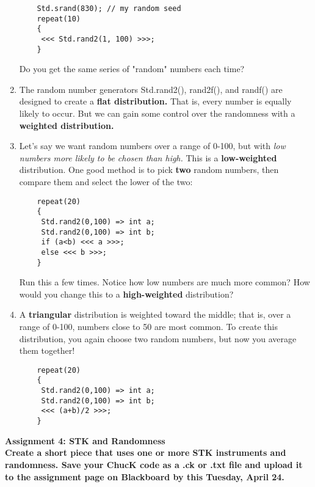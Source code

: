 \documentclass{article}
\begin{document}
\begin{enumerate}
\begin{lstlisting}
	Std.srand(830); // my random seed
	repeat(10)
	{
	 <<< Std.rand2(1, 100) >>>;
	}
\end{lstlisting}

Do you get the same series of "random" numbers each time?

\item The random number generators Std.rand2(), rand2f(), and randf() are designed to create a \textbf{flat distribution.} That is, every number is equally likely to occur. But we can gain some control over the randomness with a \textbf{weighted distribution.} 

\item Let's say we want random numbers over a range of 0-100, but with \textsl{low numbers more likely to be chosen than high.} This is a \textbf{low-weighted} distribution. One good method is to pick \textbf{two} random numbers, then compare them and select the lower of the two:

\begin{lstlisting}
	repeat(20)
	{
	 Std.rand2(0,100) => int a;
	 Std.rand2(0,100) => int b;
	 if (a<b) <<< a >>>;
	 else <<< b >>>;
	}
\end{lstlisting}

Run this a few times. Notice how low numbers are much more common? How would you change this to a \textbf{high-weighted} distribution?

\item A \textbf{triangular} distribution is weighted toward the middle; that is, over a range of 0-100, numbers close to 50 are most common. To create this distribution, you again choose two random numbers, but now you average them together!

\begin{lstlisting}
	repeat(20)
	{
	 Std.rand2(0,100) => int a;
	 Std.rand2(0,100) => int b;
	 <<< (a+b)/2 >>>;
	}
\end{lstlisting}



\end{enumerate}

\textbf{Assignment 4: STK and Randomness}\vspace{2mm}
\\
\textbf{Create a short piece that uses one or more STK instruments and randomness. Save your ChucK code as a .ck or .txt file and
upload it to the assignment page on Blackboard by this Tuesday, April 24.}
\end{document}
